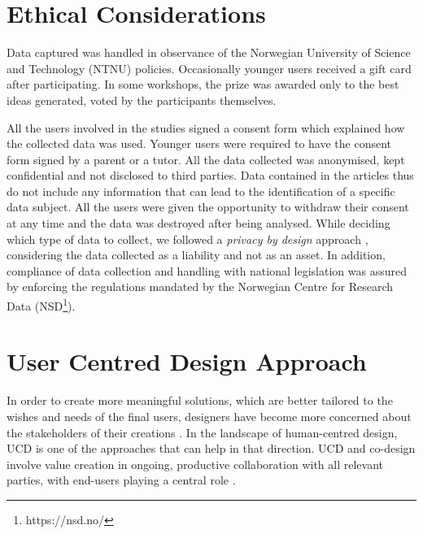 \section{Ethical Considerations}

Data captured was handled in observance of the Norwegian University of Science and Technology (NTNU) policies. Occasionally younger users received a gift card after participating. In some workshops, the prize was awarded only to the best ideas generated, voted by the participants themselves.

All the users involved in the studies signed a consent form which explained how the collected data was used. Younger users were required to have the consent form signed by a parent or a tutor. All the data collected was anonymised, kept confidential and not disclosed to third parties. Data contained in the articles thus do not include any information that can lead to the identification of a specific data subject. All the users were given the opportunity to withdraw their consent at any time and the data was destroyed after being analysed.
While deciding which type of data to collect, we followed a \textit{privacy by design} approach \autocite{cavoukian_privacy_2009}, considering the data collected as a liability and not as an asset. In addition, compliance of data collection and handling with national legislation was assured by enforcing the regulations mandated by the Norwegian Centre for Research Data (NSD\footnote{https://nsd.no/}).


\section{User Centred Design Approach}

In order to create more meaningful solutions, which are better tailored to the wishes and needs of the final users, designers have become more concerned about the stakeholders of their creations \autocite{sanders_co-creation_2008}. In the landscape of human-centred design, UCD is one of the approaches that can help in that direction.
UCD and co-design involve value creation in ongoing, productive collaboration with all relevant parties, with end-users playing a central role \autocite{jansen_7_2017}.

